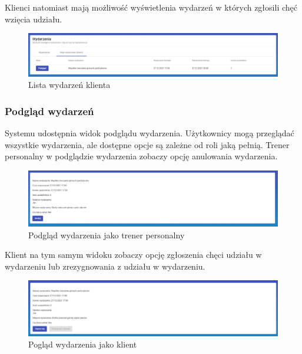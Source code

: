 \documentclass[a4paper,twoside,12pt]{book}
\begin{document}
Klienci natomiast mają możliwość wyświetlenia wydarzeń w których zgłosili chęć wzięcia udziału.
\begin{figure}[H]
	\centering
	\includegraphics[width=1\linewidth]{../zrzuty_ekranu/dzialanie/wydarzenia/klient_lista_wydarzen}
	\caption{Lista wydarzeń klienta}
	\label{fig:klientlistawydarzen}
\end{figure}

\subsubsection{Podgląd wydarzeń}
Systemu udostępnia widok podglądu wydarzenia. Użytkownicy mogą przeglądać wszystkie wydarzenia, ale dostępne opcje są zależne od roli jaką pełnią. Trener personalny w podglądzie wydarzenia zobaczy opcję anulowania wydarzenia.
\begin{figure}[H]
	\centering
	\includegraphics[width=1\linewidth]{../zrzuty_ekranu/dzialanie/wydarzenia/trener_podlad_wydarzenie}
	\caption{Podgląd wydarzenia jako trener personalny}
	\label{fig:trenerpodladwydarzenie}
\end{figure}

Klient na tym samym widoku zobaczy opcję zgłoszenia chęci udziału w wydarzeniu lub zrezygnowania z udziału w wydarzeniu.
\begin{figure}[H]
	\centering
	\includegraphics[width=1\linewidth]{../zrzuty_ekranu/dzialanie/wydarzenia/klient_podlad_wydarzenia}
	\caption{Pogląd wydarzenia jako klient}
	\label{fig:klientpodladwydarzenia}
\end{figure}
\end{document}
